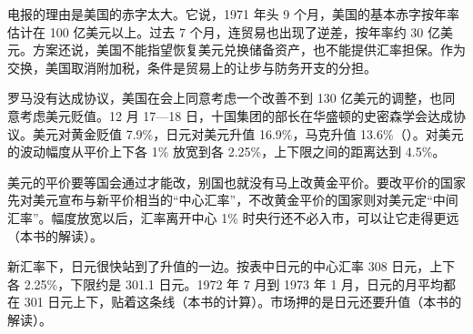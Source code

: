 电报的理由是美国的赤字太大。它说，1971 年头 9 个月，美国的基本赤字按年率估计在 100 亿美元以上\cite{frus46a}。过去 7 个月，连贸易也出现了逆差，按年率约 30 亿美元\cite{frus46a}。方案还说，美国不能指望恢复美元兑换储备资产，也不能提供汇率担保\cite{frus46a}。作为交换，美国取消附加税，条件是贸易上的让步与防务开支的分担\cite{frus46a}。

罗马没有达成协议，美国在会上同意考虑一个改善不到 130 亿美元的调整，也同意考虑美元贬值\cite{bis1972}。12 月 17—18 日，十国集团的部长在华盛顿的史密森学会达成协议\cite{frus46a}。美元对黄金贬值 7.9\%，日元对美元升值 16.9\%，马克升值 13.6\%（）\cite{bis1972}。对美元的波动幅度从平价上下各 1\% 放宽到各 2.25\%，上下限之间的距离达到 4.5\%\cite{bis1972}。

美元的平价要等国会通过才能改，别国也就没有马上改黄金平价\cite{bis1972}。要改平价的国家先对美元宣布与新平价相当的“中心汇率”，不改黄金平价的国家则对美元定“中间汇率”\cite{bis1972}。幅度放宽以后，汇率离开中心 1\% 时央行还不必入市，可以让它走得更远（本书的解读）。

新汇率下，日元很快站到了升值的一边。按表中日元的中心汇率 308 日元，上下各 2.25\%，下限约是 301.1 日元\cite{bis1972}。1972 年 7 月到 1973 年 1 月，日元的月平均都在 301 日元上下，贴着这条线（本书的计算）\cite{bisdata46}。市场押的是日元还要升值（本书的解读）。


